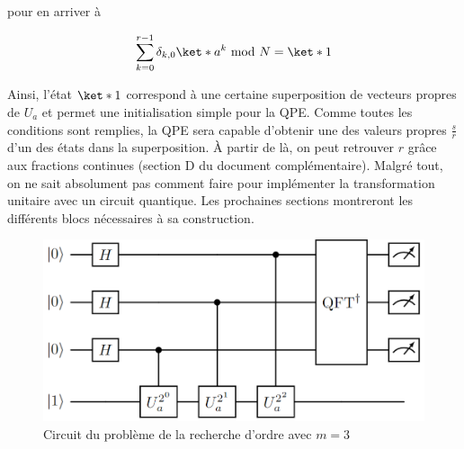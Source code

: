 pour en arriver à

\begin{equation*}
    \sum_{k=0}^{r-1}\delta_{k,0}\ket*{a^k \text{ mod } N} = \ket*{1}
\end{equation*}


Ainsi, l'état $\ket*{1}$ correspond à une certaine superposition de vecteurs propres de $U_a$ et permet une initialisation simple pour la QPE. Comme toutes les conditions sont remplies, la QPE sera capable d'obtenir une des valeurs propres $\frac{s}{r}$ d'un des états dans la superposition. À partir de là, on peut retrouver $r$ grâce aux fractions continues (section D du document complémentaire). Malgré tout, on ne sait absolument pas comment faire pour implémenter la transformation unitaire avec un circuit quantique. Les prochaines sections montreront les différents blocs nécessaires à sa construction.

\begin{figure}[H]
    \centering
    \includegraphics[scale=0.4]{images/circuit_ordre.png}
    \caption{Circuit du problème de la recherche d'ordre avec $m=3$}
\end{figure}